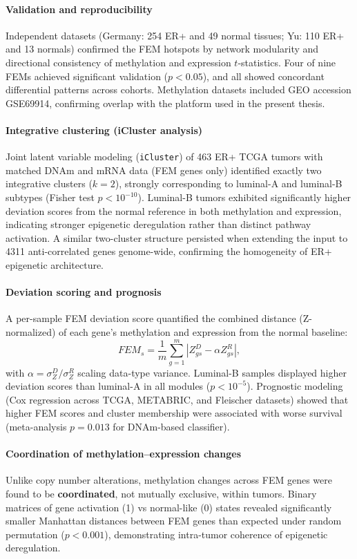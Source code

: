 \documentclass[10pt]{extarticle}
\begin{document}
\paragraph{Validation and reproducibility}
Independent datasets (Germany: 254 ER+ and 49 normal tissues; Yu: 110 ER+ and 13 normals) confirmed the FEM hotspots by network modularity and directional consistency of methylation and expression \(t\)-statistics. Four of nine FEMs achieved significant validation (\(p<0.05\)), and all showed concordant differential patterns across cohorts. Methylation datasets included GEO accession GSE69914, confirming overlap with the platform used in the present thesis.

\paragraph{Integrative clustering (iCluster analysis)}
Joint latent variable modeling (\texttt{iCluster}) of 463 ER+ TCGA tumors with matched DNAm and mRNA data (FEM genes only) identified exactly two integrative clusters (\(k=2\)), strongly corresponding to luminal-A and luminal-B subtypes (Fisher test \(p < 10^{-10}\)).  
Luminal-B tumors exhibited significantly higher deviation scores from the normal reference in both methylation and expression, indicating stronger epigenetic deregulation rather than distinct pathway activation. A similar two-cluster structure persisted when extending the input to 4311 anti-correlated genes genome-wide, confirming the homogeneity of ER+ epigenetic architecture.

\paragraph{Deviation scoring and prognosis}
A per-sample FEM deviation score quantified the combined distance (Z-normalized) of each gene’s methylation and expression from the normal baseline:
\[
FEM_s = \frac{1}{m} \sum_{g=1}^{m} |Z^D_{gs} - \alpha Z^R_{gs}|,
\]
with \(\alpha = \sigma_Z^D / \sigma_Z^R\) scaling data-type variance.  
Luminal-B samples displayed higher deviation scores than luminal-A in all modules (\(p<10^{-5}\)). Prognostic modeling (Cox regression across TCGA, METABRIC, and Fleischer datasets) showed that higher FEM scores and cluster membership were associated with worse survival (meta-analysis \(p=0.013\) for DNAm-based classifier).

\paragraph{Coordination of methylation–expression changes}
Unlike copy number alterations, methylation changes across FEM genes were found to be \textbf{coordinated}, not mutually exclusive, within tumors. Binary matrices of gene activation (1) vs normal-like (0) states revealed significantly smaller Manhattan distances between FEM genes than expected under random permutation (\(p<0.001\)), demonstrating intra-tumor coherence of epigenetic deregulation.
\end{document}
